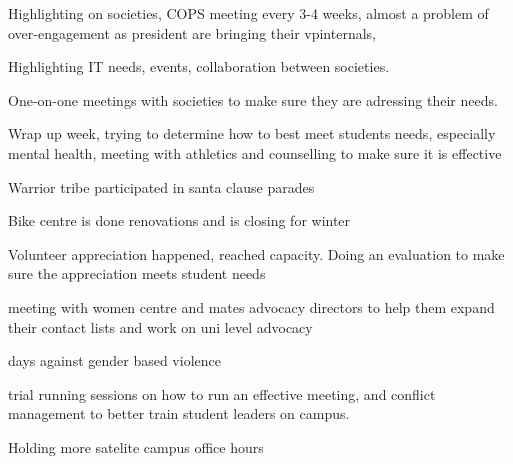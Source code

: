 \begin{information}
    Highlighting on societies, COPS meeting every 3-4 weeks, almost a problem
    of over-engagement as president are bringing their vpinternals, 

    Highlighting IT needs, events, collaboration between societies. 

    One-on-one meetings with societies to make sure they are adressing their 
    needs.

    Wrap up week, trying to determine how to best meet students needs, especially
    mental health, meeting with athletics and counselling to make sure it is
    effective

    Warrior tribe participated in santa clause parades

    Bike centre is done renovations and is closing for winter

    Volunteer appreciation happened, reached capacity. Doing an evaluation to
    make sure the appreciation meets student needs

    meeting with women centre and mates advocacy directors to help them
    expand their contact lists and work on uni level advocacy

    days against gender based violence

    trial running sessions on how to run an effective meeting, and conflict management to
    better train student leaders on campus. 

    Holding more satelite campus office hours
    
\end{information}

